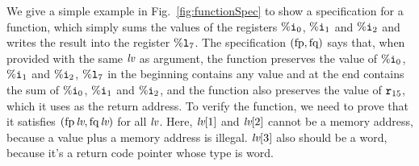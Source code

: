 We give a simple example in Fig.~\ref{fig:functionSpec}
to show a specification for a function, which simply
sums the values of the registers $\%\texttt{i}_{0}$, $\%\texttt{i}_{1}$ and $\%\texttt{i}_{2}$
and writes the result into the register $\%\texttt{l}_{7}$.
The specification $(\text{fp},\text{fq})$ says that, when
provided with the same $\textit{lv}$ as argument, the function
preserves the value of $\%\texttt{i}_{0}$, $\%\texttt{i}_{1}$ and $\%\texttt{i}_{2}$,
$\%\texttt{l}_{7}$ in the beginning contains any value and
at the end contains the sum of $\%\texttt{i}_{0}$, $\%\texttt{i}_{1}$ and $\%\texttt{i}_{2}$,
and the function also preserves the value of $\texttt{r}_{15}$,
which it uses as the return address.
To verify the function, we need to prove that it satisfies
$(\text{fp}\,\textit{lv}, \text{fq}\,\textit{lv})$ for all $\textit{lv}$.
Here, $\textit{lv}[1]$ and $\textit{lv}[2]$ cannot be a memory address,
because a value plus a memory address is illegal.
$\textit{lv}[3]$ also should be a word, because it's a
return code pointer whose type is word.





